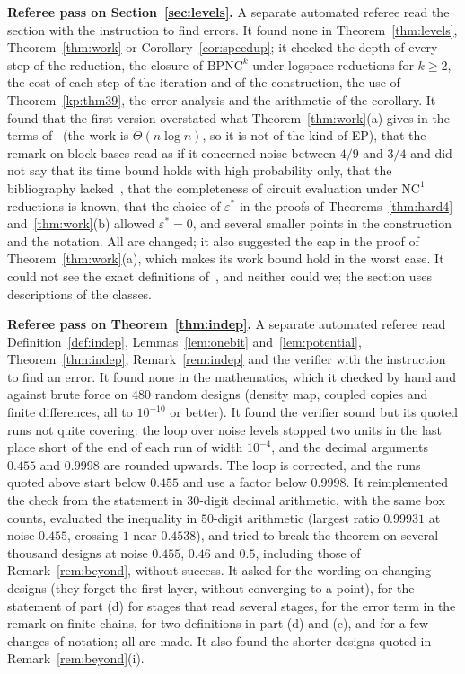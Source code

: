 \documentclass[11pt]{amsart}
\theoremstyle{definition}
\theoremstyle{remark}
\newcommand{\eps}{\varepsilon}
\begin{document}
\medskip\noindent\textbf{Referee pass on Section~\ref{sec:levels}.} A separate automated referee
read the section with the instruction to find errors. It found none in Theorem~\ref{thm:levels},
Theorem~\ref{thm:work} or Corollary~\ref{cor:speedup}; it checked the depth of every step of the
reduction, the closure of $\mathrm{BPNC}^k$ under logspace reductions for $k\ge2$, the cost of each
step of the iteration and of the construction, the use of Theorem~\ref{kp:thm39}, the error analysis
and the arithmetic of the corollary. It found that the first version overstated what
Theorem~\ref{thm:work}(a) gives in the terms of~\cite{krs} (the work is $\Theta(n\log n)$, so it is
not of the kind of EP), that the remark on block bases read as if it concerned noise between
$4/9$ and $3/4$ and did not say that its time bound holds with high probability only, that the
bibliography lacked~\cite{krs}, that the completeness of circuit evaluation under $\mathrm{NC}^1$
reductions is known, that the choice of $\eps^*$ in the proofs of Theorems~\ref{thm:hard4}
and~\ref{thm:work}(b) allowed $\eps^*=0$, and several smaller points in the construction and the
notation. All are changed; it also suggested the cap in the proof of Theorem~\ref{thm:work}(a),
which makes its work bound hold in the worst case. It could not see the exact definitions
of~\cite{krs}, and neither could we; the section uses descriptions of the classes.

\medskip\noindent\textbf{Referee pass on Theorem~\ref{thm:indep}.} A separate automated referee
read Definition~\ref{def:indep}, Lemmas~\ref{lem:onebit} and~\ref{lem:potential},
Theorem~\ref{thm:indep}, Remark~\ref{rem:indep} and the verifier with the instruction to find an
error. It found none in the mathematics, which it checked by hand and against brute force on $480$
random designs (density map, coupled copies and finite differences, all to $10^{-10}$ or better).
It found the verifier sound but its quoted runs not quite covering: the loop over noise levels
stopped two units in the last place short of the end of each run of width $10^{-4}$, and the
decimal arguments $0.455$ and $0.9998$ are rounded upwards. The loop is corrected, and the runs
quoted above start below $0.455$ and use a factor below $0.9998$. It reimplemented the check from
the statement in $30$-digit decimal arithmetic, with the same box counts, evaluated the inequality
in $50$-digit arithmetic (largest ratio $0.99931$ at noise $0.455$, crossing $1$ near $0.4538$),
and tried to break the theorem on several thousand designs at noise $0.455$, $0.46$ and $0.5$,
including those of Remark~\ref{rem:beyond}, without success. It asked for the wording on changing
designs (they forget the first layer, without converging to a point), for the statement of
part (d) for stages that read several stages, for the error term in the remark on finite chains,
for two definitions in part (d) and (c), and for a few changes of notation; all are made. It also
found the shorter designs quoted in Remark~\ref{rem:beyond}(i).
\end{document}
